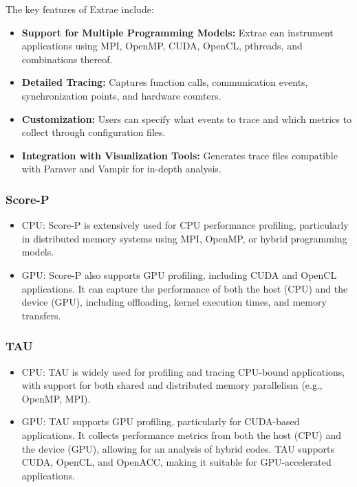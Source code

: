 The key features of Extrae include:

\begin{itemize}
  \item \textbf{Support for Multiple Programming Models:} Extrae can instrument applications using MPI, OpenMP, CUDA, OpenCL, pthreads, and combinations thereof.
  \item \textbf{Detailed Tracing:} Captures function calls, communication events, synchronization points, and hardware counters.
  \item \textbf{Customization:} Users can specify what events to trace and which metrics to collect through configuration files.
  \item \textbf{Integration with Visualization Tools:} Generates trace files compatible with Paraver and Vampir for in-depth analysis.
\end{itemize}


\subsubsection{Score-P}
\label{sec:methodology-tools-scorep}

\begin{itemize}
    \item CPU: Score-P is extensively used for CPU performance profiling, particularly in distributed memory systems using MPI, OpenMP, or hybrid programming models.
    \item GPU: Score-P also supports GPU profiling, including CUDA and OpenCL applications. It can capture the performance of both the host (CPU) and the device (GPU), including offloading, kernel execution times, and memory transfers.
\end{itemize}


\subsubsection{TAU}
\label{sec:methodology-tools-tau}

\begin{itemize}
    \item CPU: TAU is widely used for profiling and tracing CPU-bound applications, with support for both shared and distributed memory parallelism (e.g., OpenMP, MPI).
    \item GPU: TAU supports GPU profiling, particularly for CUDA-based applications. It collects performance metrics from both the host (CPU) and the device (GPU), allowing for an analysis of hybrid codes. TAU supports CUDA, OpenCL, and OpenACC, making it suitable for GPU-accelerated applications.
\end{itemize}


